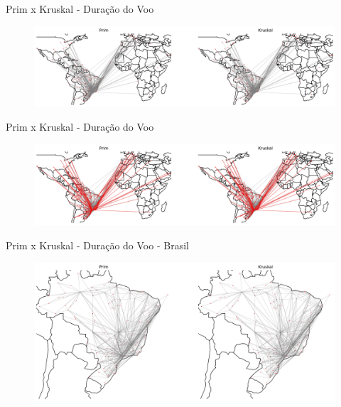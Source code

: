 \documentclass[aspectratio=169,usenames,dvipsnames]{beamer}
\begin{document}
\begin{frame}{Prim x Kruskal - Duração do Voo}
    \begin{figure}[ht]
        \centering
        \includegraphics[width=\textwidth]{figs/world_time_mst_0.pdf}
    \end{figure}
\end{frame}

\begin{frame}{Prim x Kruskal - Duração do Voo}
    \begin{figure}[ht]
        \centering
        \includegraphics[width=\textwidth]{figs/world_time_mst_1.pdf}
    \end{figure}
\end{frame}

\begin{frame}{Prim x Kruskal - Duração do Voo - Brasil}
    \begin{figure}[ht]
        \centering
        \includegraphics[width=\textwidth]{figs/brasil_time_mst_0.pdf}
    \end{figure}
\end{frame}
\end{document}
